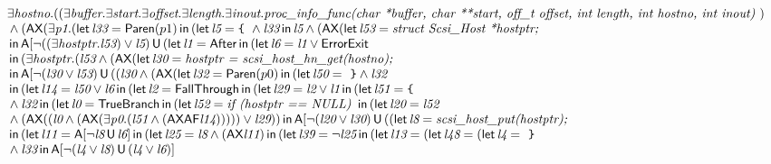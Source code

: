 \documentclass{article}
\newcommand{\U}{\,\mbox{\sf{U}}\,}
\newcommand{\A}{\mbox{\sf{A}}}
\newcommand{\AX}{\mbox{\sf{AX}}}
\newcommand{\AF}{\mbox{\sf{AF}}}
\newcommand{\mita}[1]{\mbox{\it{{#1}}}}
\newcommand{\msf}[1]{\mbox{\sf{{#1}}}}
\newcommand{\ttlb}{\mbox{\tt \char'173}}
\newcommand{\ttrb}{\mbox{\tt \char'175}}
\begin{document}
\[\begin{array}{l}
\exists \mita{hostno} . ((\exists \mita{buffer} . \exists \mita{start} . \exists \mita{offset} . \exists \mita{length} . \exists \mita{inout} . \mita{proc\_info\_func(char *buffer, char **start, off\_t offset, int length,
               int hostno, int inout) })\\\mbox{} \wedge (\AX(\exists \mita{p1} . (\mita{\sf{let}} \, \mita{l33} = \msf{Paren}(p1) \, \mita{\sf{in}} \, (\mita{\sf{let}} \, \mita{l5} = \mita{{\ttlb}
  } \wedge \mita{l33} \, \mita{\sf{in}} \, \mita{l5} \wedge (\AX(\mita{\sf{let}} \, \mita{l53} = \mita{struct Scsi\_Host *hostptr;}\\\mbox{} \, \mita{\sf{in}} \, \A[\neg ((\exists \mita{hostptr} . \mita{l53}) \vee \mita{l5}) \U (\mita{\sf{let}} \, \mita{l1} = \msf{After} \, \mita{\sf{in}} \, (\mita{\sf{let}} \, \mita{l6} = \mita{l1} \vee \msf{ErrorExit}\\\mbox{} \, \mita{\sf{in}} \, (\exists \mita{hostptr} . (\mita{l53} \wedge (\AX(\mita{\sf{let}} \, \mita{l30} = \mita{hostptr = scsi\_host\_hn\_get(hostno);}\\\mbox{} \, \mita{\sf{in}} \, \A[\neg (\mita{l30} \vee \mita{l53}) \U ((\mita{l30} \wedge (\AX(\mita{\sf{let}} \, \mita{l32} = \msf{Paren}(p0) \, \mita{\sf{in}} \, (\mita{\sf{let}} \, \mita{l50} = \mita{
{\ttrb}} \wedge \mita{l32}\\\mbox{} \, \mita{\sf{in}} \, (\mita{\sf{let}} \, \mita{l14} = \mita{l50} \vee \mita{l6} \, \mita{\sf{in}} \, (\mita{\sf{let}} \, \mita{l2} = \msf{FallThrough} \, \mita{\sf{in}} \, (\mita{\sf{let}} \, \mita{l29} = \mita{l2} \vee \mita{l1} \, \mita{\sf{in}} \, (\mita{\sf{let}} \, \mita{l51} = \mita{{\ttlb}
  }\\\mbox{} \wedge \mita{l32} \, \mita{\sf{in}} \, (\mita{\sf{let}} \, \mita{l0} = \msf{TrueBranch} \, \mita{\sf{in}} \, (\mita{\sf{let}} \, \mita{l52} = \mita{if (hostptr == NULL) } \, \mita{\sf{in}} \, (\mita{\sf{let}} \, \mita{l20} = \mita{l52}\\\mbox{} \wedge (\AX((\mita{l0} \wedge (\AX(\exists \mita{p0} . (\mita{l51} \wedge (\AX\AF\mita{l14}))))) \vee \mita{l29})) \, \mita{\sf{in}} \, \A[\neg (\mita{l20} \vee \mita{l30}) \U ((\mita{\sf{let}} \, \mita{l8} = \mita{scsi\_host\_put(hostptr);}\\\mbox{} \, \mita{\sf{in}} \, (\mita{\sf{let}} \, \mita{l11} = \A[\neg \mita{l8} \U \mita{l6}]
 \, \mita{\sf{in}} \, (\mita{\sf{let}} \, \mita{l25} = \mita{l8} \wedge (\AX\mita{l11}) \, \mita{\sf{in}} \, (\mita{\sf{let}} \, \mita{l39} = \neg \mita{l25} \, \mita{\sf{in}} \, (\mita{\sf{let}} \, \mita{l13} = (\mita{\sf{let}} \, \mita{l48} = (\mita{\sf{let}} \, \mita{l4} = \mita{
{\ttrb}}\\\mbox{} \wedge \mita{l33} \, \mita{\sf{in}} \, \A[\neg (\mita{l4} \vee \mita{l8}) \U (\mita{l4} \vee \mita{l6})]


\end{array}\]
\end{document}
